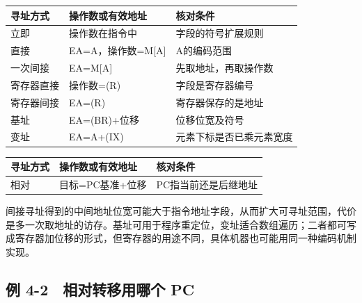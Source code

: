 \begin{wideblock}

\par\medskip\noindent\begin{minipage}{\linewidth}\fontsize{9.3}{12}\selectfont\begin{tabularx}{\linewidth}{@{}YYY@{}}
\toprule\noalign{}
寻址方式 & 操作数或有效地址 & 核对条件 \\
\midrule\noalign{}


立即 & 操作数在指令中 & 字段的符号扩展规则 \\
直接 & EA=A，操作数=M{[}A{]} & A的编码范围 \\
一次间接 & EA=M{[}A{]} & 先取地址，再取操作数 \\
寄存器直接 & 操作数=(R) & 字段是寄存器编号 \\
寄存器间接 & EA=(R) & 寄存器保存的是地址 \\
基址 & EA=(BR)+位移 & 位移位宽及符号 \\
变址 & EA=A+(IX) & 元素下标是否已乘元素宽度 \\
\bottomrule\end{tabularx}
\end{minipage}\par\medskip

\par\medskip\noindent\begin{minipage}{\linewidth}\fontsize{9.3}{12}\selectfont\begin{tabularx}{\linewidth}{@{}YYY@{}}
\toprule\noalign{}
寻址方式 & 操作数或有效地址 & 核对条件 \\
\midrule\noalign{}


相对 & 目标=PC基准+位移 & PC指当前还是后继地址 \\
\bottomrule\end{tabularx}
\end{minipage}\par\medskip

\end{wideblock}

间接寻址得到的中间地址位宽可能大于指令地址字段，从而扩大可寻址范围，代价是多一次取地址的访存。基址可用于程序重定位，变址适合数组遍历；二者都可写成寄存器加位移的形式，但寄存器的用途不同，具体机器也可能用同一种编码机制实现。

\subsection{例 4-2　相对转移用哪个 PC}\label{CO04-05}

